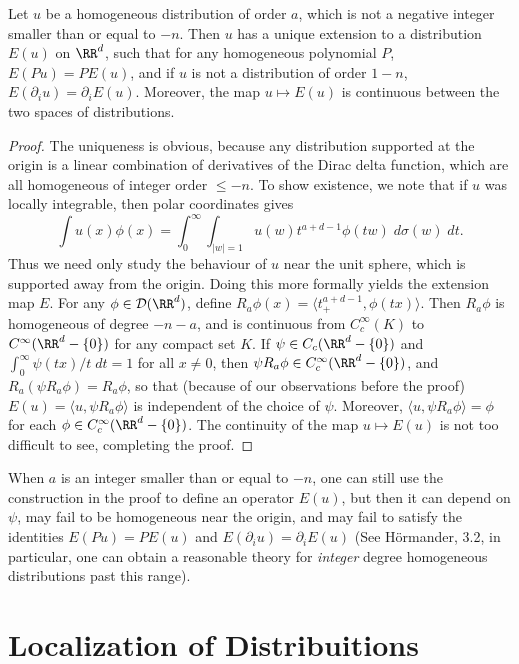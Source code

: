 \begin{theorem}
    Let $u$ be a homogeneous distribution of order $a$, which is not a negative integer smaller than or equal to $-n$. Then $u$ has a unique extension to a distribution $E(u)$ on $\RR^d$, such that for any homogeneous polynomial $P$, $E(Pu) = P E(u)$, and if $u$ is not a distribution of order $1-n$, $E(\partial_i u) = \partial_i E(u)$. Moreover, the map $u \mapsto E(u)$ is continuous between the two spaces of distributions.
\end{theorem}
\begin{proof}
    The uniqueness is obvious, because any distribution supported at the origin is a linear combination of derivatives of the Dirac delta function, which are all homogeneous of integer order $\leq -n$. To show existence, we note that if $u$ was locally integrable, then polar coordinates gives
    \[ \int u(x) \phi(x) = \int_0^\infty \int_{|w| = 1} u(w) t^{a + d-1} \phi(t w)\; d\sigma(w)\; dt. \]
    Thus we need only study the behaviour of $u$ near the unit sphere, which is supported away from the origin. Doing this more formally yields the extension map $E$. For any $\phi \in \mathcal{D}(\RR^d)$, define $R_a \phi(x) = \langle t^{a + d-1}_+, \phi(tx) \rangle$. Then $R_a \phi$ is homogeneous of degree $-n-a$, and is continuous from $C_c^\infty(K)$ to $C^\infty(\RR^d - \{ 0 \})$ for any compact set $K$. If $\psi \in C_c(\RR^d - \{ 0 \})$ and $\int_0^\infty \psi(tx)/t\; dt = 1$ for all $x \neq 0$, then $\psi R_a \phi \in C_c^\infty(\RR^d - \{ 0 \})$, and $R_a(\psi R_a \phi) = R_a \phi$, so that (because of our observations before the proof) $E(u) = \langle u, \psi R_a \phi \rangle$ is independent of the choice of $\psi$. Moreover, $\langle u, \psi R_a \phi \rangle = \phi$ for each $\phi \in C_c^\infty(\RR^d - \{ 0 \})$. The continuity of the map $u \mapsto E(u)$ is not too difficult to see, completing the proof.
\end{proof}

When $a$ is an integer smaller than or equal to $-n$, one can still use the construction in the proof to define an operator $E(u)$, but then it can depend on $\psi$, may fail to be homogeneous near the origin, and may fail to satisfy the identities $E(Pu) = PE(u)$ and $E(\partial_i u) = \partial_i E(u)$ (See H\"{o}rmander, 3.2, in particular, one can obtain a reasonable theory for \emph{integer} degree homogeneous distributions past this range).

\section{Localization of Distribuitions}

